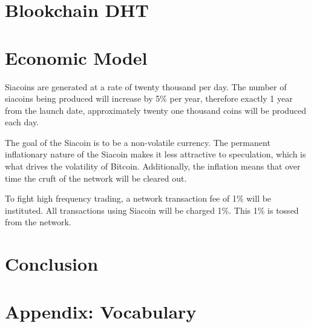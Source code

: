 \documentclass[twocolumn]{article}
\begin{document}
\section{Blookchain DHT}

\section{Economic Model}

Siacoins are generated at a rate of twenty thousand per day.
The number of siacoins being produced will increase by 5\% per year, therefore exactly 1 year from the launch date, approximately twenty one thousand coins will be produced each day.

The goal of the Siacoin is to be a non-volatile currency.
The permanent inflationary nature of the Siacoin makes it less attractive to speculation, which is what drives the volatility of Bitcoin.
Additionally, the inflation means that over time the cruft of the network will be cleared out.

To fight high frequency trading, a network transaction fee of 1\% will be instituted.
All transactions using Siacoin will be charged 1\%.
This 1\% is tossed from the network.

\section{Conclusion}

\section{Appendix: Vocabulary}
\end{document}
